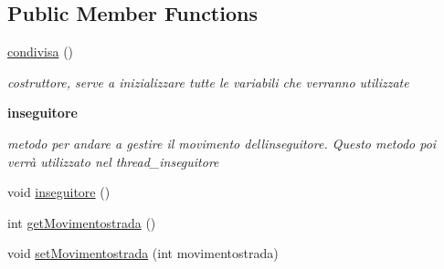 \subsection*{Public Member Functions}
\begin{DoxyCompactItemize}
\item 
\hyperlink{classcargame_1_1condivisa_a96b9f2e5620278c04a6c027b23b67dc3}{condivisa} ()
\begin{DoxyCompactList}\small\item\em costruttore, serve a inizializzare tutte le variabili che verranno utilizzate \end{DoxyCompactList}\end{DoxyCompactItemize}
\begin{Indent}\textbf{ inseguitore}\par
{\em metodo per andare a gestire il movimento dell\textquotesingle{}inseguitore. Questo metodo poi verrà utilizzato nel thread\+\_\+inseguitore }\begin{DoxyCompactItemize}
\item 
void \hyperlink{classcargame_1_1condivisa_a54112d941742c218419e82d00f4d3490}{inseguitore} ()
\item 
int \hyperlink{classcargame_1_1condivisa_ae81960e9152c97ef612f172f8ea2d68d}{get\+Movimentostrada} ()
\item 
void \hyperlink{classcargame_1_1condivisa_ac46fe43a46f5b9232c29e36c7e4a65d4}{set\+Movimentostrada} (int movimentostrada)
\end{DoxyCompactItemize}
\end{Indent}
